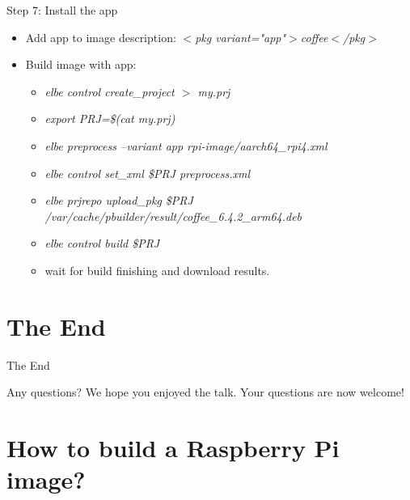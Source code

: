 \documentclass{beamer}
\begin{document}
\begin{frame}{Step 7: Install the app}
	\begin{itemize}
		\item Add app to image description: \emph{$<$pkg variant="app"$>$coffee$<$/pkg$>$}
		\item Build image with app:
		\small{\begin{itemize}
				\item \emph{elbe control create\_project $>$ my.prj}
				\item \emph{export PRJ=\$(cat my.prj)}
				\item \emph{elbe preprocess --variant app rpi-image/aarch64\_rpi4.xml}
				\item \emph{elbe control set\_xml \$PRJ preprocess.xml}
				\item \emph{elbe prjrepo upload\_pkg \$PRJ /var/cache/pbuilder/result/coffee\_6.4.2\_arm64.deb}
				\item \emph{elbe control build \$PRJ}
				\item wait for build finishing and download results.
		\end{itemize}}
	\end{itemize}
\end{frame}

\section{The End}

\begin{frame}{The End}
	\begin{block}{Any questions?}
		We hope you enjoyed the talk.
		Your questions are now welcome!
	\end{block}
\end{frame}


\section{How to build a Raspberry Pi image?}
\end{document}
